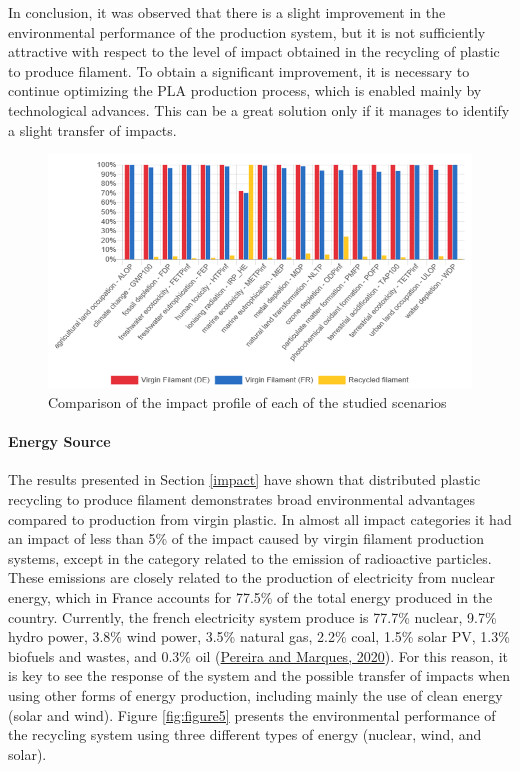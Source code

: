 \documentclass[12pt]{elsarticle} %
\begin{document}
In conclusion, it was observed that there is a slight improvement in the environmental performance of the production system, but it is not sufficiently attractive with respect to the level of impact obtained in the recycling of plastic to produce filament.
To obtain a significant improvement, it is necessary to continue optimizing the PLA production process, which is enabled mainly by technological advances.
This can be a great solution only if it manages to identify a slight transfer of impacts.

\begin{figure}[H]

{\centering \includegraphics[width=0.9\linewidth,]{Figures/Figure-4} 

}

\caption{Comparison of the impact profile of each of the studied scenarios}\label{fig:figure4}
\end{figure}

\hypertarget{energy-source}{%
\paragraph{Energy Source}\label{energy-source}}

The results presented in Section \ref{impact} have shown that distributed plastic recycling to produce filament demonstrates broad environmental advantages compared to production from virgin plastic.
In almost all impact categories it had an impact of less than 5\% of the impact caused by virgin filament production systems, except in the category related to the emission of radioactive particles.
These emissions are closely related to the production of electricity from nuclear energy, which in France accounts for 77.5\% of the total energy produced in the country.
Currently, the french electricity system produce is 77.7\% nuclear, 9.7\% hydro power, 3.8\% wind power, 3.5\% natural gas, 2.2\% coal, 1.5\% solar PV, 1.3\% biofuels and wastes, and 0.3\% oil (\protect\hyperlink{ref-pereira2020}{Pereira and Marques, 2020}).
For this reason, it is key to see the response of the system and the possible transfer of impacts when using other forms of energy production, including mainly the use of clean energy (solar and wind).
Figure \ref{fig:figure5} presents the environmental performance of the recycling system using three different types of energy (nuclear, wind, and solar).
\end{document}
